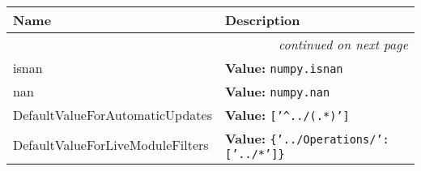     \vspace{-1cm}
\hspace{\varindent}\begin{longtable}{|p{\varnamewidth}|p{\vardescrwidth}|l}
\cline{1-2}
\cline{1-2} \centering \textbf{Name} & \centering \textbf{Description}& \\
\cline{1-2}
\endhead\cline{1-2}\multicolumn{3}{r}{\small\textit{continued on next page}}\\\endfoot\cline{1-2}
\endlastfoot\raggedright i\-s\-n\-a\-n\- & \raggedright \textbf{Value:} 
{\tt numpy.isnan}&\\
\cline{1-2}
\raggedright n\-a\-n\- & \raggedright \textbf{Value:} 
{\tt numpy.nan}&\\
\cline{1-2}
\raggedright D\-e\-f\-a\-u\-l\-t\-V\-a\-l\-u\-e\-F\-o\-r\-A\-u\-t\-o\-m\-a\-t\-i\-c\-U\-p\-d\-a\-t\-e\-s\- & \raggedright \textbf{Value:} 
{\tt ['{\textasciicircum}../(.*)']}&\\
\cline{1-2}
\raggedright D\-e\-f\-a\-u\-l\-t\-V\-a\-l\-u\-e\-F\-o\-r\-L\-i\-v\-e\-M\-o\-d\-u\-l\-e\-F\-i\-l\-t\-e\-r\-s\- & \raggedright \textbf{Value:} 
{\tt \{'../Operations/': ['../*']\}}&\\
\cline{1-2}
\end{longtable}

